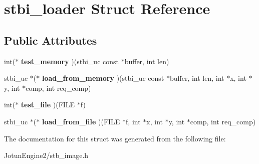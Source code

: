 \hypertarget{structstbi__loader}{\section{stbi\-\_\-loader Struct Reference}
\label{structstbi__loader}
}
\subsection*{Public Attributes}
\begin{DoxyCompactItemize}
\item 
\hypertarget{structstbi__loader_a201eb378b8088dedddab3b0877ddb28e}{int($\ast$ {\bfseries test\-\_\-memory} )(stbi\-\_\-uc const $\ast$buffer, int len)}\label{structstbi__loader_a201eb378b8088dedddab3b0877ddb28e}

\item 
\hypertarget{structstbi__loader_a0c73a72aaee24c2ecd57d37227ad0ea9}{stbi\-\_\-uc $\ast$($\ast$ {\bfseries load\-\_\-from\-\_\-memory} )(stbi\-\_\-uc const $\ast$buffer, int len, int $\ast$x, int $\ast$y, int $\ast$comp, int req\-\_\-comp)}\label{structstbi__loader_a0c73a72aaee24c2ecd57d37227ad0ea9}

\item 
\hypertarget{structstbi__loader_a70a23fd7d611819a0dc22dc82546f87b}{int($\ast$ {\bfseries test\-\_\-file} )(F\-I\-L\-E $\ast$f)}\label{structstbi__loader_a70a23fd7d611819a0dc22dc82546f87b}

\item 
\hypertarget{structstbi__loader_a8069fd62c4a48286dc40f42506864e00}{stbi\-\_\-uc $\ast$($\ast$ {\bfseries load\-\_\-from\-\_\-file} )(F\-I\-L\-E $\ast$f, int $\ast$x, int $\ast$y, int $\ast$comp, int req\-\_\-comp)}\label{structstbi__loader_a8069fd62c4a48286dc40f42506864e00}

\end{DoxyCompactItemize}


The documentation for this struct was generated from the following file\-:\begin{DoxyCompactItemize}
\item 
Jotun\-Engine2/stb\-\_\-image.\-h\end{DoxyCompactItemize}

